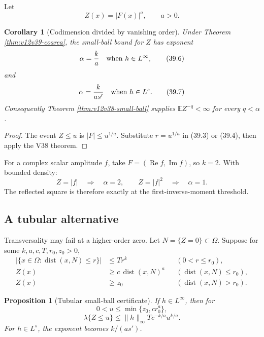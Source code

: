 \documentclass[11pt]{article}
\newtheorem{proposition}[theorem]{Proposition}
\newtheorem{corollary}[theorem]{Corollary}
\theoremstyle{remark}
\begin{document}
Let
\begin{equation}
                         Z(x)=|F(x)|^a,\qquad a>0.           \tag{39.5}
\end{equation}

\begin{corollary}[Codimension divided by vanishing order]
\label{cor:v12v39-exponent}
Under Theorem \ref{thm:v12v39-coarea}, the small-ball bound for \(Z\)
has exponent
\begin{equation}
 \alpha={k\over a}
 \quad\text{when }h\in L^\infty,                 \tag{39.6}
\end{equation}
and
\begin{equation}
 \alpha={k\over as'}
 \quad\text{when }h\in L^s.                      \tag{39.7}
\end{equation}
Consequently Theorem \ref{thm:v12v38-small-ball} supplies
\(\mathbb E Z^{-q}<\infty\) for every \(q<\alpha\).
\end{corollary}

\begin{proof}
The event \(Z\leq u\) is
\(|F|\leq u^{1/a}\).  Substitute
\(r=u^{1/a}\) in (39.3) or (39.4), then apply the V38 theorem.
\end{proof}

For a complex scalar amplitude \(f\), take
\(F=(\operatorname{Re}f,\operatorname{Im}f)\), so \(k=2\).
With bounded density:
\[
 Z=|f| \quad\Longrightarrow\quad\alpha=2,
 \qquad
 Z=|f|^2 \quad\Longrightarrow\quad\alpha=1.       \tag{39.8}
\]
The reflected square is therefore exactly at the first-inverse-moment
threshold.

\subsection{A tubular alternative}

Transversality may fail at a higher-order zero.  Let
\(N=\{Z=0\}\subset\Omega\).  Suppose for some
\(k,a,c,T,r_0,z_0>0\),
\begin{align}
 |\{x\in\Omega:\operatorname{dist}(x,N)\leq r\}|
 &\leq Tr^k
 &&(0<r\leq r_0),                                \tag{39.9}\\
 Z(x)&\geq c\,\operatorname{dist}(x,N)^a
 &&(\operatorname{dist}(x,N)\leq r_0),           \tag{39.10}\\
 Z(x)&\geq z_0
 &&(\operatorname{dist}(x,N)>r_0).               \tag{39.11}
\end{align}

\begin{proposition}[Tubular small-ball certificate]
\label{prop:v12v39-tubular}
If \(h\in L^\infty\), then for
\[
 0<u\leq\min\{z_0,cr_0^a\},
\]
\begin{equation}
 \lambda\{Z\leq u\}
 \leq
 \|h\|_\infty T c^{-k/a}u^{k/a}.                 \tag{39.12}
\end{equation}
For \(h\in L^s\), the exponent becomes \(k/(as')\).
\end{proposition}
\end{document}
